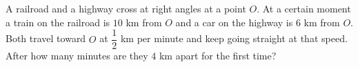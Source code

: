 A railroad and a highway cross at right angles at a point $O$. At a certain moment a train on the railroad is $10$ km from $O$ and a car on the highway is $6$ km from $O$. Both travel toward $O$ at $\dfrac{1}{2}$ km per minute and keep going straight at that speed. After how many minutes are they $4$ km apart for the first time?
